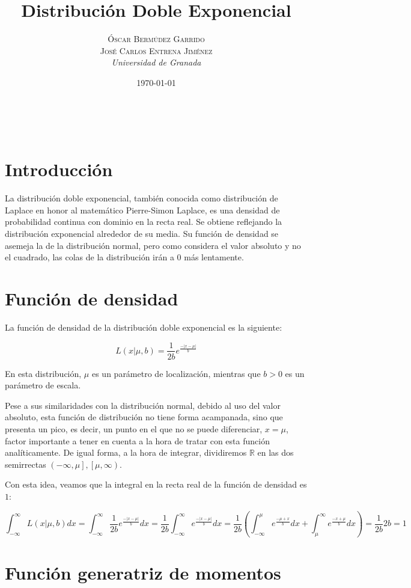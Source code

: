 \documentclass[a4paper, 10pt]{article} %
\title{\textbf{Distribución Doble Exponencial}\\ %
\vspace{20 pt}
} %
\author{\textsc{Óscar Bermúdez Garrido\\José Carlos Entrena Jiménez} %
\\{\textit{Universidad de Granada}}} %
\date{\today} %
\makeatletter
\renewcommand{\maketitle}{ %
\begin{center} %
{\Huge\@title} %
\end{center}

\vspace{20pt} %

\begin{flushright} %
{\large\@author} %
\\\@date %

\vspace{40pt} %
\end{flushright}
\renewcommand{\baselinestretch}{0.5}

}
\makeatother
\begin{document}
\maketitle
\tableofcontents
\pagebreak

\section{Introducción}

La distribución doble exponencial, también conocida como distribución de Laplace en honor al matemático Pierre-Simon Laplace, es una densidad de probabilidad continua con dominio en la recta real. Se obtiene reflejando la distribución exponencial alrededor de su media. Su función de densidad se asemeja la de la distribución normal, pero como considera el valor absoluto y no el cuadrado, las colas de la distribución irán a $0$ más lentamente. 

\section{Función de densidad}

La función de densidad de la distribución doble exponencial es la siguiente: 

$$L(x|\mu, b)=\frac{1}{2b}e^\frac{-|x-\mu|}{b}$$

En esta distribución, $\mu$ es un parámetro de localización, mientras que $b > 0$ es un parámetro de escala. 

Pese a sus similaridades con la distribución normal, debido al uso del valor absoluto, esta función de distribución no tiene forma acampanada, sino que presenta un pico, es decir, un punto en el que no se puede diferenciar, $x = \mu$, factor importante a tener en cuenta a la hora de tratar con esta función analíticamente. De igual forma, a la hora de integrar, dividiremos $\mathbb{R}$ en las dos semirrectas $\left(-\infty, \mu\right], \left[\mu, \infty\right)$.

Con esta idea, veamos que la integral en la recta real de la función de densidad es $1$: 

$$\int_{-\infty}^{\infty} L(x|\mu, b)dx = \int_{-\infty}^{\infty} \frac{1}{2b}e^\frac{-|x-\mu|}{b}dx =
\frac{1}{2b}\int_{-\infty}^{\infty}e^\frac{-|x-\mu|}{b}dx = 
\frac{1}{2b}\left( \int_{-\infty}^{\mu}e^\frac{-\mu+x}{b}dx + \int_{\mu}^{\infty}e^\frac{-x+\mu}{b}dx \right) =
\frac{1}{2b}2b = 1$$
 

\section{Función generatriz de momentos}
\end{document}
